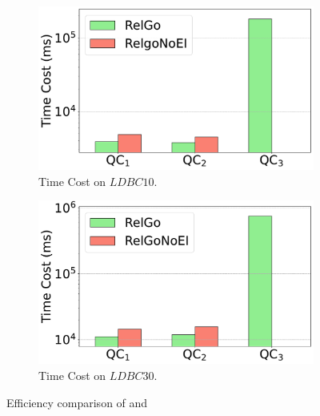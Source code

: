 \begin{figure}[t]
    \vspace{-1.6em}
    \centering
    \begin{subfigure}[b]{.45\linewidth}
        \centering
        \includegraphics[width=\linewidth]{./figures/exp/ablation_ei_sf10.pdf}
        \vspace{-2em}
        \caption{Time Cost on $LDBC10$.}
        \label{fig:exp-expand-intersect-sf10}
    \end{subfigure}
    \begin{subfigure}[b]{0.45\linewidth}
        \centering
        \includegraphics[width=\linewidth]{./figures/exp/ablation_ei_sf30.pdf}
        \vspace{-2em}
        \caption{Time Cost on $LDBC30$.}
        \label{fig:exp-expand-intersect-sf30}
    \end{subfigure}
    \caption{Efficiency comparison of \name and \relgomj}
    \label{fig:exp-expand-intersect}
\end{figure}


